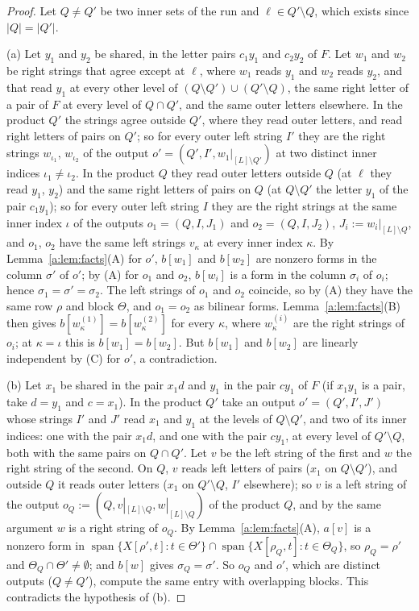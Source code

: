 \documentclass[11pt]{article}
\theoremstyle{definition}
\theoremstyle{remark}
\begin{document}
\begin{proof}
Let $Q\ne Q'$ be two inner sets of the run and $\ell\in Q'\setminus Q$, which exists since $|Q|=|Q'|$.

(a) Let $y_1$ and $y_2$ be shared, in the letter pairs $c_1y_1$ and $c_2y_2$ of $F$. Let $w_1$ and $w_2$ be right strings that agree except at $\ell$, where $w_1$ reads $y_1$ and $w_2$ reads $y_2$, and that read $y_1$ at every other level of $(Q\setminus Q')\cup(Q'\setminus Q)$, the same right letter of a pair of $F$ at every level of $Q\cap Q'$, and the same outer letters elsewhere. In the product $Q'$ the strings agree outside $Q'$, where they read outer letters, and read right letters of pairs on $Q'$; so for every outer left string $I'$ they are the right strings $w_{\iota_1}$, $w_{\iota_2}$ of the output $o'=(Q',I',w_1|_{[L]\setminus Q'})$ at two distinct inner indices $\iota_1\ne\iota_2$. In the product $Q$ they read outer letters outside $Q$ (at $\ell$ they read $y_1$, $y_2$) and the same right letters of pairs on $Q$ (at $Q\setminus Q'$ the letter $y_1$ of the pair $c_1y_1$); so for every outer left string $I$ they are the right strings at the same inner index $\iota$ of the outputs $o_1=(Q,I,J_1)$ and $o_2=(Q,I,J_2)$, $J_i:=w_i|_{[L]\setminus Q}$, and $o_1$, $o_2$ have the same left strings $v_\kappa$ at every inner index $\kappa$. By Lemma~\ref{a:lem:facts}(A) for $o'$, $b[w_1]$ and $b[w_2]$ are nonzero forms in the column $\sigma'$ of $o'$; by (A) for $o_1$ and $o_2$, $b[w_i]$ is a form in the column $\sigma_i$ of $o_i$; hence $\sigma_1=\sigma'=\sigma_2$. The left strings of $o_1$ and $o_2$ coincide, so by (A) they have the same row $\rho$ and block $\Theta$, and $o_1=o_2$ as bilinear forms. Lemma~\ref{a:lem:facts}(B) then gives $b[w^{(1)}_\kappa]=b[w^{(2)}_\kappa]$ for every $\kappa$, where $w^{(i)}_\kappa$ are the right strings of $o_i$; at $\kappa=\iota$ this is $b[w_1]=b[w_2]$. But $b[w_1]$ and $b[w_2]$ are linearly independent by (C) for $o'$, a contradiction.

(b) Let $x_1$ be shared in the pair $x_1d$ and $y_1$ in the pair $cy_1$ of $F$ (if $x_1y_1$ is a pair, take $d=y_1$ and $c=x_1$). In the product $Q'$ take an output $o'=(Q',I',J')$ whose strings $I'$ and $J'$ read $x_1$ and $y_1$ at the levels of $Q\setminus Q'$, and two of its inner indices: one with the pair $x_1d$, and one with the pair $cy_1$, at every level of $Q'\setminus Q$, both with the same pairs on $Q\cap Q'$. Let $v$ be the left string of the first and $w$ the right string of the second. On $Q$, $v$ reads left letters of pairs ($x_1$ on $Q\setminus Q'$), and outside $Q$ it reads outer letters ($x_1$ on $Q'\setminus Q$, $I'$ elsewhere); so $v$ is a left string of the output $o_Q:=(Q,v|_{[L]\setminus Q},w|_{[L]\setminus Q})$ of the product $Q$, and by the same argument $w$ is a right string of $o_Q$. By Lemma~\ref{a:lem:facts}(A), $a[v]$ is a nonzero form in $\operatorname{span}\{X[\rho',t]:t\in\Theta'\}\cap\operatorname{span}\{X[\rho_Q,t]:t\in\Theta_Q\}$, so $\rho_Q=\rho'$ and $\Theta_Q\cap\Theta'\ne\emptyset$; and $b[w]$ gives $\sigma_Q=\sigma'$. So $o_Q$ and $o'$, which are distinct outputs ($Q\ne Q'$), compute the same entry with overlapping blocks. This contradicts the hypothesis of (b).
\end{proof}
\end{document}
